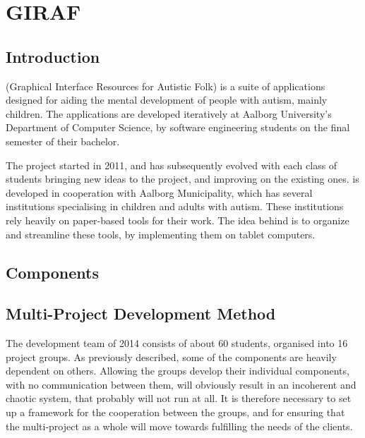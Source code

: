 \chapter{GIRAF}\label{chap:giraf}

\section{Introduction}\label{sec:giraf:introduction}
\giraf (Graphical Interface Resources for Autistic Folk) is a suite of applications designed for aiding the mental development of people with autism, mainly children. The applications are developed iteratively at Aalborg University's Department of Computer Science, by software engineering students on the final semester of their bachelor.

The project started in 2011, and has subsequently evolved with each class of students bringing new ideas to the project, and improving on the existing ones.
\giraf is developed in cooperation with Aalborg Municipality, which has several institutions specialising in children and adults with autism. 
These institutions rely heavily on paper-based tools for their work. 
The idea behind \giraf is to organize and streamline these tools, by implementing them on tablet computers.

\section{\giraf Components}\label{sec:giraf:components}

\section{Multi-Project Development Method}\label{sec:giraf:development}
The \giraf development team of 2014 consists of about 60 students, organised into 16 project groups. As previously described, some of the \giraf components are heavily dependent on others. Allowing the groups develop their individual components, with no communication between them, will obviously result in an incoherent and chaotic system, that probably will not run at all. It is therefore necessary to set up a framework for the cooperation between the groups, and for ensuring that the multi-project as a whole will move towards fulfilling the needs of the clients.

